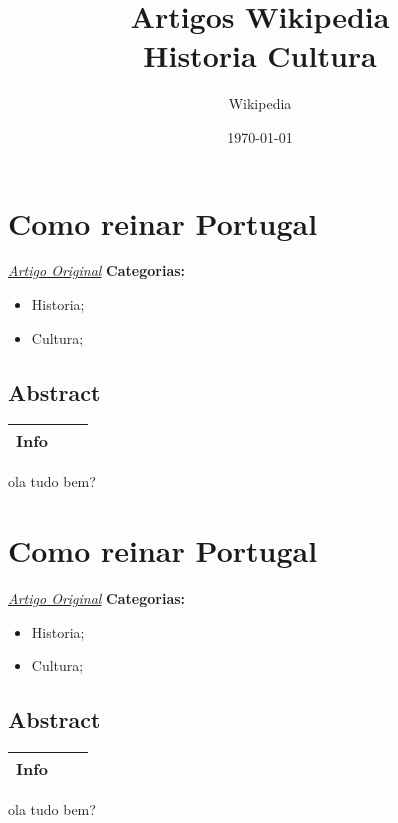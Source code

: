 \documentclass[a4paper]{article}
\begin{document}
\title{Artigos Wikipedia \\
            \large Historia Cultura }
\maketitle
\author{Wikipedia}
\date{\today}
\setcounter{tocdepth}{1}
\tableofcontents

\newpage
\section{Como reinar Portugal}
\href{www.google.pt}{\textit{Artigo Original}}
\newline
\textbf{Categorias:}
\begin{itemize}
	\item Historia;
	\item Cultura;
\end{itemize}
\subsection{Abstract}

\begin{tabular}{|p{3cm}||p{3cm}|p{3cm}|p{3cm}|}
\hline
\multicolumn{2}{|c|}{Info} \\
\hline
\end{tabular}
ola tudo bem? 
\newpage
\section{Como reinar Portugal}
\href{www.google.pt}{\textit{Artigo Original}}
\newline
\textbf{Categorias:}
\begin{itemize}
	\item Historia;
	\item Cultura;
\end{itemize}
\subsection{Abstract}

\begin{tabular}{|p{3cm}||p{3cm}|p{3cm}|p{3cm}|}
\hline
\multicolumn{2}{|c|}{Info} \\
\hline
\end{tabular}
ola tudo bem? 
\newpage
\end{document}
